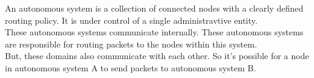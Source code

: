 An autonomous system is a collection of connected nodes with a clearly defined routing policy. It is under control of a single administravtive entity. \\
These autonomous systems communicate internally. These autonomous systems are responsible for routing packets to the nodes within this system. \\
But, these domains also communicate with each other. So it's possible for a node in autonomous system A to send packets to autonomous system B.
